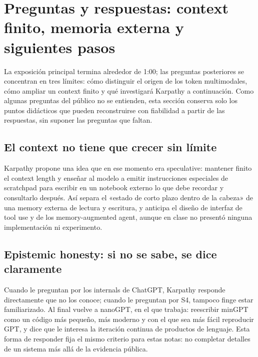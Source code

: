 \section{Preguntas y respuestas: context finito, memoria externa y siguientes pasos}

La exposición principal termina alrededor de 1:00; las preguntas posteriores se concentran en tres límites: cómo distinguir el origen de los token multimodales, cómo ampliar un context finito y qué investigará Karpathy a continuación. Como algunas preguntas del público no se entienden, esta sección conserva solo los puntos didácticos que pueden reconstruirse con fiabilidad a partir de las respuestas, sin suponer las preguntas que faltan.

\subsection{El context no tiene que crecer sin límite}

Karpathy propone una idea que en ese momento era speculative: mantener finito el context length y enseñar al modelo a emitir instrucciones especiales de scratchpad para escribir en un notebook externo lo que debe recordar y consultarlo después. Así separa el «estado de corto plazo dentro de la cabeza» de una memory externa de lectura y escritura, y anticipa el diseño de interfaz de tool use y de los memory-augmented agent, aunque en clase no presentó ninguna implementación ni experimento.


\subsection{Epistemic honesty: si no se sabe, se dice claramente}

Cuando le preguntan por los internals de ChatGPT, Karpathy responde directamente que no los conoce; cuando le preguntan por S4, tampoco finge estar familiarizado. Al final vuelve a nanoGPT, en el que trabaja: reescribir minGPT como un código más pequeño, más moderno y con el que sea más fácil reproducir GPT, y dice que le interesa la iteración continua de productos de lenguaje. Esta forma de responder fija el mismo criterio para estas notas: no completar detalles de un sistema más allá de la evidencia pública.

